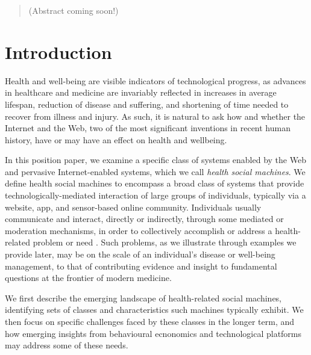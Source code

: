 \documentclass{sig-alternate}
\begin{document}
\maketitle
\begin{abstract}

(Abstract coming soon!)

\end{abstract}




\section{Introduction}

Health and well-being are visible indicators of technological
progress, as advances in healthcare and medicine are invariably
reflected in increases in average lifespan, reduction of disease and
suffering, and shortening of time needed to recover from illness and
injury.  As such, it is natural to ask how and whether the Internet
and the Web, two of the most significant inventions in recent human
history, have or may have an effect on health and wellbeing.

In this position paper, we examine a specific class of systems enabled
by the Web and pervasive Internet-enabled systems, which we call
\emph{health social machines}.  We define health social machines to
encompass a broad class of systems that provide
technologically-mediated interaction of large groups of individuals,
typically via a website, app, and sensor-based online community.
Individuals usually communicate and interact, directly or indirectly,
through some mediated or moderation mechanisms, in order to
collectively accomplish or address a health-related problem or need
\cite{hendler2010semantic}.  Such problems, as we illustrate through
examples we provide later, may be on the scale of an individual's
disease or well-being management, to that of contributing evidence and
insight to fundamental questions at the frontier of modern medicine.

We first describe the emerging landscape of health-related social
machines, identifying sets of classes and characteristics such
machines typically exhibit.  We then focus on specific challenges
faced by these classes in the longer term, and how emerging insights
from behavioural ecnonomics and technological platforms may address
some of these needs.
\end{document}
